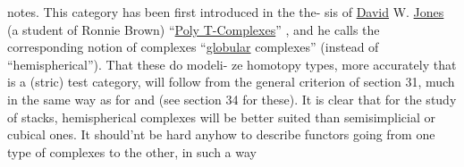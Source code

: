 notes.  This category  has been first introduced in the the-%
sis of \uline{David} W. \uline{Jones} (a student of Ronnie Brown) ``\uline{Poly T-Complexes}'' ,
 and he calls the corresponding notion of complexes
``\uline{globular} complexes'' (instead of ``hemispherical''). That these do modeli-%
ze homotopy types, more accurately that  is a (stric) test category,
will follow from the general criterion of section 31, much in the same
way as for\hand{\ensuremath{\Delta}} and \hand{\ensuremath{\square}}(see section 34 for these). It is clear that for the
study of stacks, hemispherical complexes will be better suited than
semisimplicial or cubical ones. It should'nt be hard anyhow to describe
functors going from one type of complexes to the other, in such a way 

